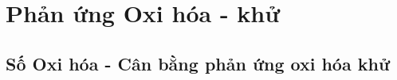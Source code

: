 \newenvironment{cacbuoc}{\begin{enumerate}[label= \color{\maunhan}\bfseries\fontfamily{qag}\selectfont{\faAdjust\;Bước \arabic*:},itemsep=0pt,wide=0cm,leftmargin=0.5cm,topsep=0pt]
	}{\end{enumerate}}
\renewcommand{\thesubsubsection}{\Roman{subsubsection}}
\titlespacing*{\subsection}{3pt}{0pt}{5pt}
\titlespacing*{\subsubsection}{3pt}{5pt}{5pt}
\titlespacing*{\paragraph}{0cm}{0cm}{5pt}
\setcounter{chapter}{3}
\chapter{Phản ứng Oxi hóa - khử}
\section{Số Oxi hóa - Cân bằng phản ứng oxi hóa khử}

